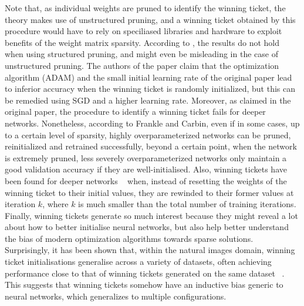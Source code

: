 Note that, as individual weights are pruned to identify the winning ticket, the theory makes use of unstructured pruning, and a winning ticket obtained by this procedure would have to rely on speciliased libraries and hardware to exploit benefits of the weight matrix sparsity. According to \cite{liu2018rethinking}, the results do not hold when using structured pruning, and might even be misleading in the case of unstructured pruning. The authors of the paper claim that the optimization algorithm (ADAM) and the small initial learning rate of the original paper lead to inferior accuracy when the winning ticket is randomly initialized, but this can be remedied using SGD and a higher learning rate. Moreover, as claimed in the original paper, the procedure to identify a winning ticket fails for deeper networks. Nonetheless, according to Frankle and Carbin, even if in some cases, up to a certain level of sparsity, highly overparameterized networks can be pruned, reinitialized and retrained successfully, beyond a certain point, when the network is extremely pruned, less severely overparameterized networks only maintain a good validation accuracy if they are well-initialised. Also, winning tickets have been found for deeper networks ~\autocite{frankle2019lottery} when, instead of resetting the weights of the winning ticket to their initial values, they are rewinded to their former values at iteration $k$, where $k$ is much smaller than the total number of training iterations. Finally, winning tickets generate so much interest because they might reveal a lot about how to better initialise neural networks, but also help better understand the bias of modern optimization algorithms towards sparse solutions. Surprisingly, it has been shown that, within the natural images domain, winning ticket initialisations generalise across a variety of datasets, often achieving performance close to that of winning tickets generated on the same dataset ~\autocite{morcos2019one}. This suggests that winning tickets somehow have an inductive bias generic to neural networks, which generalizes to multiple configurations. 


